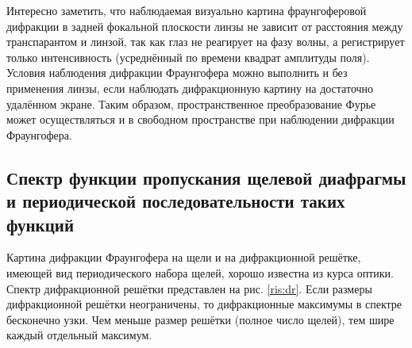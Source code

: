 \documentclass[a5paper,10pt, twoside]{article} %
\begin{document}
	Интересно заметить, что наблюдаемая визуально картина фраунгоферовой дифракции в задней 
	фокальной плоскости линзы не зависит от расстояния между транспарантом и линзой, так как 
	глаз не реагирует на фазу волны, а регистрирует только интенсивность (усреднённый по времени 
	квадрат амплитуды поля). Условия наблюдения дифракции Фраунгофера можно выполнить и без 
	применения линзы, если наблюдать дифракционную картину на достаточно удалённом экране. 
	Таким образом, пространственное преобразование Фурье может осуществляться и в свободном 
	пространстве при наблюдении дифракции Фраунгофера.
	
\subsection{Спектр функции пропускания щелевой диафрагмы и периодической последовательности таких функций}
	
	Картина дифракции Фраунгофера на щели и на дифракционной решётке, имеющей вид периодического 
	набора щелей, хорошо известна из курса оптики. Спектр дифракционной решётки представлен на 
	рис. \ref{ris:dr}. Если размеры дифракционной решётки неограничены, то дифракционные 
	максимумы в спектре бесконечно узки. Чем меньше размер решётки	(полное число щелей), 
	тем шире каждый отдельный максимум.
	
\end{document}
